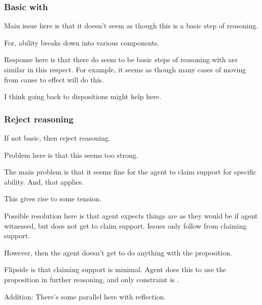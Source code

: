 \subsubsection{\AR{} Basic with \ur{}}
\label{sec:ar-basic-with}

\begin{note}
  Main issue here is that it doesn't seem as though this is a basic step of reasoning.

  For, ability breaks down into various components.

  Response here is that there do seem to be basic steps of reasoning with are similar in this respect.
  For example, it seems as though many cases of moving from cause to effect will do this.

  I think going back to dispositions might help here.
  
\end{note}

\subsubsection{Reject reasoning}
\label{sec:reject-reasoning}

\begin{note}
  If not basic, then reject reasoning.
\end{note}

\begin{note}
  Problem here is that this seems too strong.
\end{note}

\begin{note}
  The main problem is that it seems fine for the agent to claim support for specific ability.
  And, that  applies.

  This gives rise to some tension.

  Possible resolution here is that agent expects things are as they would be if agent witnessed, but does not get to claim support.
  Issues only follow from claiming support.

  However, then the agent doesn't get to do anything with the proposition.

  Flipside is that claiming support is minimal.
  Agent does this to use the proposition in further reasoning, and only constraint is \eiS{}.
\end{note}

\begin{note}
  Addition:
  There's some parallel here with reflection.
\end{note}

